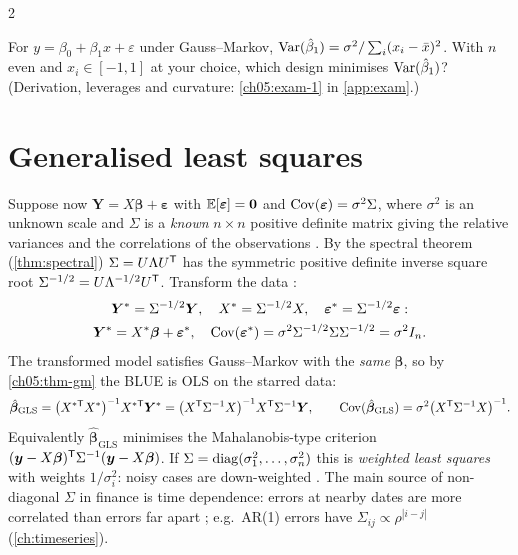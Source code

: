 \begin{paracol}{2}
\begin{exercise}\label{ch05:exam-1-short}
For $y=\beta_0+\beta_1x+\varepsilon$ under Gauss--Markov, $\operatorname{Var}(\hat\beta_1)=\sigma^2/\sum_i(x_i-\bar x)^2$. With $n$ even and $x_i\in[-1,1]$ at your choice, which design minimises $\operatorname{Var}(\hat\beta_1)$? (Derivation, leverages and curvature: \cref{ch05:exam-1} in \cref{app:exam}.)
\end{exercise}

\section{Generalised least squares}\label{ch05:sec-gls}
Suppose now $\bm Y=X\bm\beta+\bm\varepsilon$ with $\mathbb{E}[\bm\varepsilon]=\bm 0$ and $\operatorname{Cov}(\bm\varepsilon)=\sigma^2\Sigma$, where $\sigma^2$ is an unknown scale
and $\Sigma$ is a \emph{known} $n\times n$ positive definite matrix giving the relative variances and the
correlations of the observations  . By the spectral theorem
(\cref{thm:spectral}) $\Sigma=U\Lambda U^{\mathsf T}$ has the symmetric positive definite inverse square root
$\Sigma^{-1/2}=U\Lambda^{-1/2}U^{\mathsf T}$. Transform the data  :
\[\begin{gathered}
  \bm Y^*=\Sigma^{-1/2}\bm Y,\quad X^*=\Sigma^{-1/2}X,\quad \bm\varepsilon^*=\Sigma^{-1/2}\bm\varepsilon:\\
  \bm Y^*=X^*\bm\beta+\bm\varepsilon^*,\quad \operatorname{Cov}(\bm\varepsilon^*)=\sigma^2\Sigma^{-1/2}\Sigma\Sigma^{-1/2}=\sigma^2I_n .
\end{gathered}\]
The transformed model satisfies Gauss--Markov with the \emph{same} $\bm\beta$, so by \cref{ch05:thm-gm} the BLUE is
OLS on the starred data:
\begin{equation}\label{ch05:eq-gls}
  \hat{\bm\beta}_{\text{GLS}}=\bigl(X^{*\mathsf T}X^*\bigr)^{-1}X^{*\mathsf T}\bm Y^*=\bigl(X^{\mathsf T}\Sigma^{-1}X\bigr)^{-1}X^{\mathsf T}\Sigma^{-1}\bm Y,
  \qquad \operatorname{Cov}(\hat{\bm\beta}_{\text{GLS}})=\sigma^2\bigl(X^{\mathsf T}\Sigma^{-1}X\bigr)^{-1}.
\end{equation}
Equivalently $\hat{\bm\beta}_{\text{GLS}}$ minimises the Mahalanobis-type criterion $(\bm y-X\bm\beta)^{\mathsf T}\Sigma^{-1}(\bm y-X\bm\beta)$. If
$\Sigma=\operatorname{diag}(\sigma_1^2,\dots,\sigma_n^2)$ this is \emph{weighted least squares} with weights $1/\sigma_i^2$: noisy cases are
down-weighted  . The main source of non-diagonal $\Sigma$ in finance is time
dependence: errors at nearby dates are more correlated than errors far apart ; e.g.\ AR(1)
errors have $\Sigma_{ij}\propto\rho^{|i-j|}$ (\cref{ch:timeseries}).


\end{paracol}
